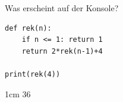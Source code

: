 \question[2]
Was erscheint auf der Konsole?
\begin{lstlisting}
def rek(n):
    if n <= 1: return 1
    return 2*rek(n-1)+4

print(rek(4))
\end{lstlisting}
\begin{solutionbox}{1cm}
36
\end{solutionbox}
